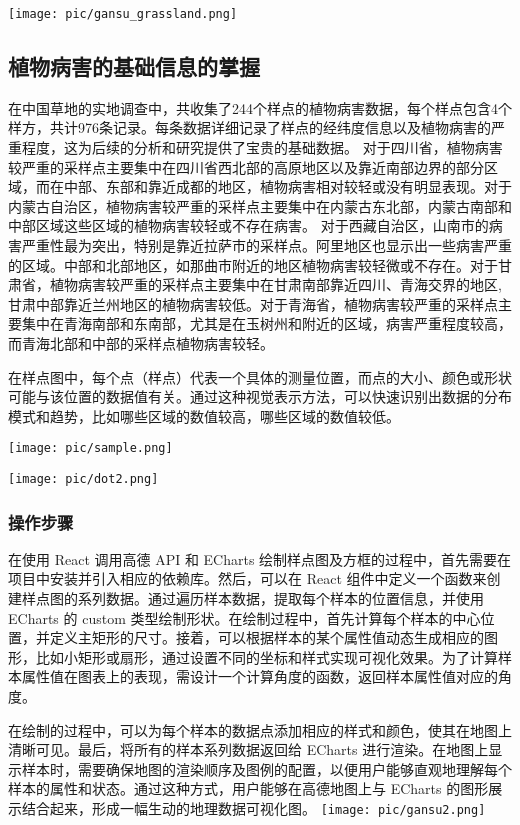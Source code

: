 \documentclass{article}
\begin{document}
\texttt{[image: pic/gansu\_grassland.png]} %
\subsection{植物病害的基础信息的掌握}
在中国草地的实地调查中，共收集了244个样点的植物病害数据，每个样点包含4个样方，共计976条记录。每条数据详细记录了样点的经纬度信息以及植物病害的严重程度，这为后续的分析和研究提供了宝贵的基础数据。
对于四川省，植物病害较严重的采样点主要集中在四川省西北部的高原地区以及靠近南部边界的部分区域，而在中部、东部和靠近成都的地区，植物病害相对较轻或没有明显表现。对于内蒙古自治区，植物病害较严重的采样点主要集中在内蒙古东北部，内蒙古南部和中部区域这些区域的植物病害较轻或不存在病害。
对于西藏自治区，山南市的病害严重性最为突出，特别是靠近拉萨市的采样点。阿里地区也显示出一些病害严重的区域。中部和北部地区，如那曲市附近的地区植物病害较轻微或不存在。对于甘肃省，植物病害较严重的采样点主要集中在甘肃南部靠近四川、青海交界的地区,甘肃中部靠近兰州地区的植物病害较低。对于青海省，植物病害较严重的采样点主要集中在青海南部和东南部，尤其是在玉树州和附近的区域，病害严重程度较高，而青海北部和中部的采样点植物病害较轻。

在样点图中，每个点（样点）代表一个具体的测量位置，而点的大小、颜色或形状可能与该位置的数据值有关。通过这种视觉表示方法，可以快速识别出数据的分布模式和趋势，比如哪些区域的数值较高，哪些区域的数值较低。
\par
\texttt{[image: pic/sample.png]} %
\par
\texttt{[image: pic/dot2.png]} %
\subsubsection{操作步骤}

在使用 React 调用高德 API 和 ECharts 绘制样点图及方框的过程中，首先需要在项目中安装并引入相应的依赖库。然后，可以在 React 组件中定义一个函数来创建样点图的系列数据。通过遍历样本数据，提取每个样本的位置信息，并使用 ECharts 的 custom 类型绘制形状。在绘制过程中，首先计算每个样本的中心位置，并定义主矩形的尺寸。接着，可以根据样本的某个属性值动态生成相应的图形，比如小矩形或扇形，通过设置不同的坐标和样式实现可视化效果。为了计算样本属性值在图表上的表现，需设计一个计算角度的函数，返回样本属性值对应的角度。

在绘制的过程中，可以为每个样本的数据点添加相应的样式和颜色，使其在地图上清晰可见。最后，将所有的样本系列数据返回给 ECharts 进行渲染。在地图上显示样本时，需要确保地图的渲染顺序及图例的配置，以便用户能够直观地理解每个样本的属性和状态。通过这种方式，用户能够在高德地图上与 ECharts 的图形展示结合起来，形成一幅生动的地理数据可视化图。
\texttt{[image: pic/gansu2.png]} %
\end{document}
